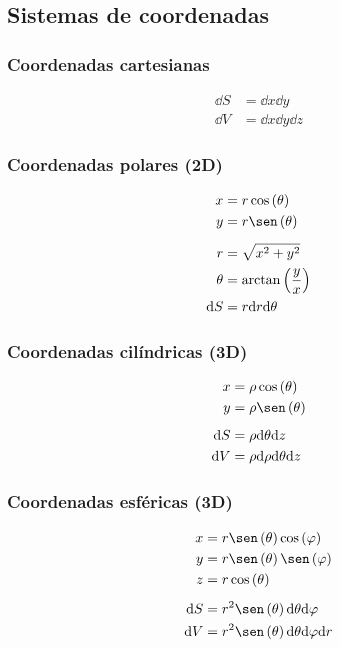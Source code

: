 \documentclass[a4paper, 8pt]{extarticle}
\begin{document}
\begin{multicols}{3}
  \subsection{Sistemas de coordenadas}
  \subsubsection{Coordenadas cartesianas}
  \begin{align*}
    \dd S & = \dd x \dd y       \\
    \dd V & = \dd x \dd y \dd z
  \end{align*}
  \subsubsection{Coordenadas polares (2D)}
  \begin{align*}
    x      & = r \cos \left( \theta \right)       \\
    y      & = r \sen \left( \theta \right)       \\[5pt]
    r      & = \sqrt{x^2 + y^2}                   \\
    \theta & = \arctan \left( \frac{y}{x} \right) \\
    \dd S  & = r \dd r \dd \theta
  \end{align*}
  \subsubsection{Coordenadas cilíndricas (3D)}
  \begin{align*}
    x     & = \rho \cos \left( \theta \right) \\
    y     & = \rho \sen \left( \theta \right) \\[5pt]
    \dd S & = \rho \dd \theta \dd z           \\
    \dd V & = \rho \dd \rho \dd \theta \dd z
  \end{align*}
  \subsubsection{Coordenadas esféricas (3D)}
  \begin{align*}
    x     & = r \sen \left( \theta \right) \cos \left( \varphi \right)    \\
    y     & = r \sen \left( \theta \right) \sen \left( \varphi \right)    \\
    z     & = r \cos \left( \theta \right)                                \\[5pt]
    \dd S & = r^2 \sen \left( \theta \right) \dd \theta \dd \varphi       \\
    \dd V & = r^2 \sen \left( \theta \right) \dd \theta \dd \varphi \dd r \\
  \end{align*}

\end{multicols}
\end{document}
